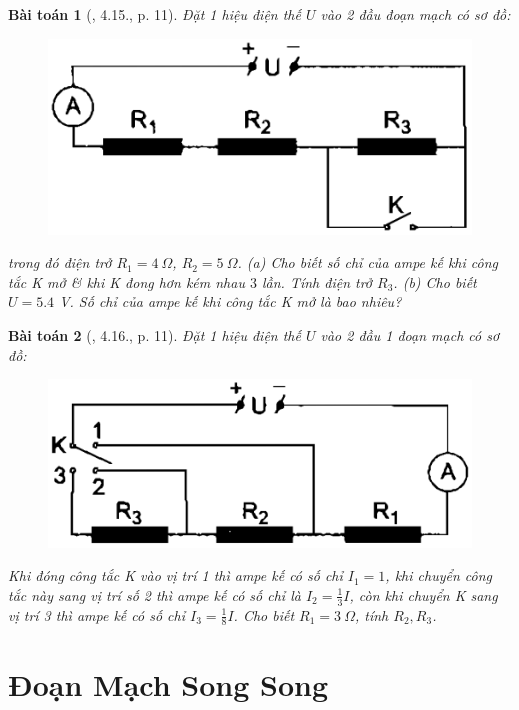 \documentclass{article}
\newtheorem{baitoan}{Bài toán}
\begin{document}
\begin{baitoan}[\cite{SBT_Vat_Ly_9}, 4.15., p. 11]
	Đặt 1 hiệu điện thế $U$ vào 2 đầu đoạn mạch có sơ đồ:
	\begin{figure}[H]
		\centering
		\includegraphics[scale=0.25]{SBT_4.4}
	\end{figure}
	\noindent trong đó điện trở $R_1 = 4\ \Omega$, $R_2 = 5\ \Omega$. (a) Cho biết số chỉ của ampe kế khi công tắc K mở \& khi K đong hơn kém nhau $3$ lần. Tính điện trở $R_3$. (b) Cho biết $U = 5.4$ \emph{V}. Số chỉ của ampe kế khi công tắc K mở là bao nhiêu?
\end{baitoan}

\begin{baitoan}[\cite{SBT_Vat_Ly_9}, 4.16., p. 11]
	Đặt 1 hiệu điện thế $U$ vào 2 đầu 1 đoạn mạch có sơ đồ:
	\begin{figure}[H]
		\centering
		\includegraphics[scale=0.25]{SBT_4.5}
	\end{figure}
	\noindent Khi đóng công tắc K vào vị trí 1 thì ampe kế có số chỉ $I_1 = 1$, khi chuyển công tắc này sang vị trí số 2 thì ampe kế có số chỉ là $I_2 = \frac{1}{3}I$, còn khi chuyển K sang vị trí 3 thì ampe kế có số chỉ $I_3 = \frac{1}{8}I$. Cho biết $R_1 = 3\ \Omega$, tính $R_2,R_3$.
\end{baitoan}


\section{Đoạn Mạch Song Song}
\end{document}
